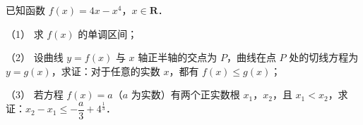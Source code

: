 \begin{question}
已知函数 \(f(x)=4x-x^4\)，\(x\in\mathbf{R}\)．

（1） 求 \(f(x)\) 的单调区间；

（2） 设曲线 \(y=f(x)\) 与 \(x\) 轴正半轴的交点为 \(P\)，曲线在点 \(P\) 处的切线方程为 \(y=g(x)\)，求证：对于任意的实数 \(x\)，都有 \(f(x)\leqslant g(x)\)；

（3） 若方程 \(f(x)=a\)（\(a\) 为实数）有两个正实数根 \(x_1\)，\(x_2\)，且 \(x_1<x_2\)，求证：\(x_2-x_1\leqslant-\dfrac{a}{3}+4^{\frac{1}{3}}\)．

\end{question}